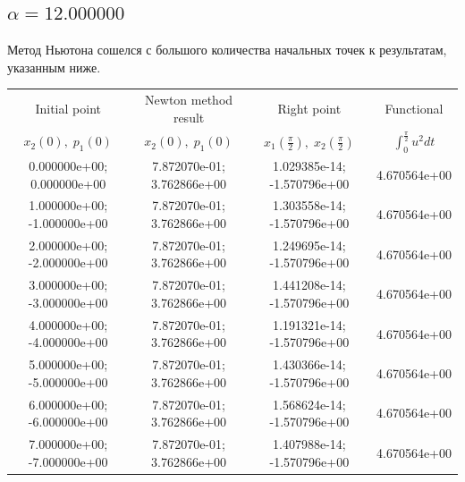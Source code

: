 \documentclass[titlepage]{article}
\def\l{\left}
\def\r{\right}
\begin{document}
\subsection{$\alpha = 12.000000$} 
Метод Ньютона сошелся с большого количества начальных точек к результатам, указанным ниже. \\ 
\begin{tabular}{ | c | c | c | c |} 
\hline 
Initial point  & Newton method result & Right point & Functional 
 \\ $x_2(0), \; p_1(0)$ & $x_2(0), \; p_1(0)$ & $x_1\l(\frac{\pi}{2}\r), \; x_2\l(\frac{\pi}{2}\r)$ & $\int_{0}^{\frac{\pi}{2}}u^2dt$  \\ \hline 
0.000000e+00; 0.000000e+00 & 7.872070e-01; 3.762866e+00 & 1.029385e-14; -1.570796e+00 & 4.670564e+00 \\ \hline 
1.000000e+00; -1.000000e+00 & 7.872070e-01; 3.762866e+00 & 1.303558e-14; -1.570796e+00 & 4.670564e+00 \\ \hline 
2.000000e+00; -2.000000e+00 & 7.872070e-01; 3.762866e+00 & 1.249695e-14; -1.570796e+00 & 4.670564e+00 \\ \hline 
3.000000e+00; -3.000000e+00 & 7.872070e-01; 3.762866e+00 & 1.441208e-14; -1.570796e+00 & 4.670564e+00 \\ \hline 
4.000000e+00; -4.000000e+00 & 7.872070e-01; 3.762866e+00 & 1.191321e-14; -1.570796e+00 & 4.670564e+00 \\ \hline 
5.000000e+00; -5.000000e+00 & 7.872070e-01; 3.762866e+00 & 1.430366e-14; -1.570796e+00 & 4.670564e+00 \\ \hline 
6.000000e+00; -6.000000e+00 & 7.872070e-01; 3.762866e+00 & 1.568624e-14; -1.570796e+00 & 4.670564e+00 \\ \hline 
7.000000e+00; -7.000000e+00 & 7.872070e-01; 3.762866e+00 & 1.407988e-14; -1.570796e+00 & 4.670564e+00 \\ \hline 
\end{tabular} 
\end{document}
